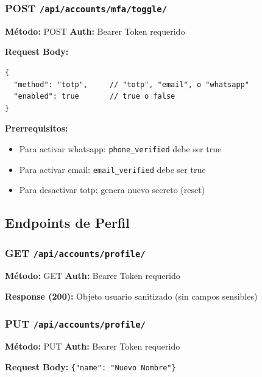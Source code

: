 \documentclass[12pt,a4paper,openany]{article}
\begin{document}
\subsubsection{POST \texttt{/api/accounts/mfa/toggle/}}

\begin{infobox}
\textbf{Método:} POST \quad \textbf{Auth:} Bearer Token requerido

\textbf{Request Body:}
\begin{lstlisting}[style=jsstyle]
{
  "method": "totp",     // "totp", "email", o "whatsapp"
  "enabled": true       // true o false
}
\end{lstlisting}

\textbf{Prerrequisitos:}
\begin{itemize}
    \item Para activar whatsapp: \texttt{phone\_verified} debe ser true
    \item Para activar email: \texttt{email\_verified} debe ser true
    \item Para desactivar totp: genera nuevo secreto (reset)
\end{itemize}
\end{infobox}

\subsection{Endpoints de Perfil}

\subsubsection{GET \texttt{/api/accounts/profile/}}

\begin{infobox}
\textbf{Método:} GET \quad \textbf{Auth:} Bearer Token requerido

\textbf{Response (200):} Objeto usuario sanitizado (sin campos sensibles)
\end{infobox}

\subsubsection{PUT \texttt{/api/accounts/profile/}}

\begin{infobox}
\textbf{Método:} PUT \quad \textbf{Auth:} Bearer Token requerido

\textbf{Request Body:} \texttt{\{"name": "Nuevo Nombre"\}}
\end{infobox}
\end{document}
